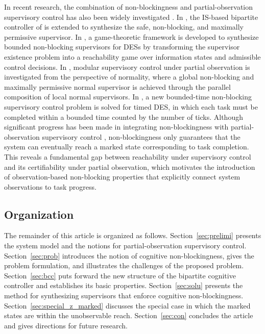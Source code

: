 \documentclass[final,5p,times,twocolumn,authoryear]{elsarticle}
\begin{document}
In recent research, the combination of non-blockingness and partial-observation supervisory control has also been widely investigated \cite{fokkink2024offline, zhang2024quantitatively}.
%
In \cite{yin2016synthesis}, the IS-based bipartite controller of \cite{yin2016uniform} is extended to synthesize the safe, non-blocking, and maximally permissive supervisor.
%
In \cite{xiang2024existence}, a game-theoretic framework is developed to synthesize bounded non-blocking supervisors for DESs by transforming the supervisor existence problem into a reachability game over information states and admissible control decisions.
%
In \cite{jan2024supervisory}, modular supervisory control under partial observation is investigated from the perspective of normality, where a global non-blocking and maximally permissive normal supervisor is achieved through the parallel composition of local normal supervisors.
%
In \cite{zhang2025bounded},  a new bounded-time non-blocking supervisory control problem is solved for timed DES, in which each task must be completed within a bounded time counted by the number of ticks.
%
Although significant progress has been made in integrating non-blockingness with partial-observation supervisory control \cite{fokkink2024offline, zhang2024quantitatively}, non-blockingness only guarantees that the system can eventually reach a marked state corresponding to task completion. 
This reveals a fundamental gap between reachability under supervisory control and its certifiability under partial observation, which motivates the introduction of observation-based non-blocking properties that explicitly connect system observations to task progress.


\subsection{Organization}

The remainder of this article is organized as follows.
%
Section~\ref{sec:prelimi} presents the system model and the notions for partial-observation supervisory control.
Section~\ref{sec:prob} introduces the notion of cognitive non-blockingness, gives the problem formulation, and illustrates the challenges of the proposed problem.
Section~\ref{sec:bcc} puts forward the new structure of the  bipartite cognitive controller and establishes its basic properties.
Section~\ref{sec:solu} presents the method for synthesizing supervisors that enforce cognitive non-blockingness.
Section~\ref{sec:special_z_marked} discusses the special case in which the marked states are within the unobservable reach.
Section~\ref{sec:con} concludes the article and gives directions for future research.
\end{document}
